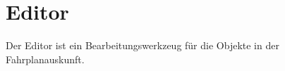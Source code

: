 \part{Editor}
\label{fahrplanauskunft_ui_windows_editor}

Der Editor ist ein Bearbeitungswerkzeug für die Objekte in der Fahrplanauskunft.